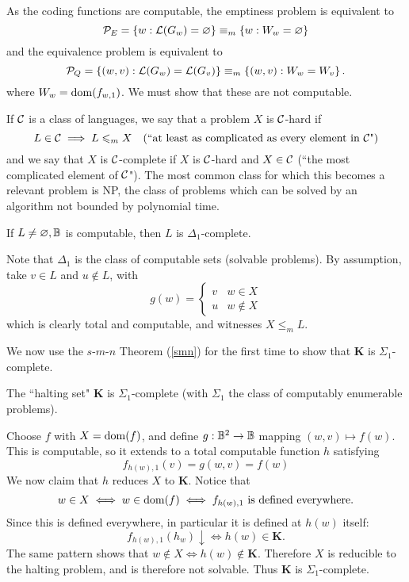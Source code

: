 \documentclass{article}
\begin{document}
As the coding functions are computable, the emptiness problem is equivalent to
\[
	\mathcal{P}_E = \left\lbrace w : \mathcal{L}(G_w) = \varnothing \right\rbrace \equiv_m \left\lbrace w : W_w = \varnothing \right\rbrace
\]
and the equivalence problem is equivalent to
\[
	\mathcal{P}_Q = \left\lbrace (w, v) : \mathcal{L}(G_w) = \mathcal{L}(G_v) \right\rbrace \equiv_m \left\lbrace (w, v): W_w = W_v \right\rbrace.
\]
where $W_w = \operatorname{dom}(f_{w,1})$. We must show that these are not computable.

If $\mathcal{C}$ is a class of languages, we say that a problem $X$ is $\mathcal{C}$-hard if
\[
	L \in \mathcal{C} \implies L \leqslant_m X \quad \text{(``at least as complicated as every element in $\mathcal{C}$")}
\]
and we say that $X$ is $\mathcal{C}$-complete if $X$ is $\mathcal{C}$-hard and $X \in \mathcal{C}$ (``the most complicated element of $\mathcal{C}$"). The most common class for which this becomes a relevant problem is NP, the class of problems which can be solved by an algorithm not bounded by polynomial time.

\begin{proposition}
	If $L \neq \varnothing, \mathbb{B}$ is computable, then $L$ is $\Delta_1$-complete.
\end{proposition}

\begin{prf}
	Note that $\Delta_1$ is the class of computable sets (solvable problems). By assumption, take $v \in L$ and $u \notin L$, with
	\[
		g(w) = \begin{cases}
		v & w \in X \\
		u & w \notin X
		\end{cases}
	\]
	which is clearly total and computable, and witnesses $X \leq_m L$.
\end{prf}

We now use the $s$-$m$-$n$ Theorem (\ref{smn}) for the first time to show that $\mathbf{K}$ is $\Sigma_1$-complete. 

\begin{theorem}
	The ``halting set" $\mathbf{K}$ is $\Sigma_1$-complete (with $\Sigma_1$ the class of computably enumerable problems).
\end{theorem}

\begin{prf}
	Choose $f$ with $X = \operatorname{dom}(f)$, and define $g: \mathbb{B}^2 \to \mathbb{B}$ mapping $(w, v) \mapsto f(w)$. This is computable, so it extends to a total computable function $h$ satisfying
	\[
		f_{h(w), 1} (v) = g(w, v) = f(w)
	\]
	We now claim that $h$ reduces $X$ to $\mathbf{K}$. Notice that
	\[
		w \in X \iff w \in \operatorname{dom}(f) \iff f_{h(w),1} \text{ is defined everywhere}.
	\]
	Since this is defined everywhere, in particular it is defined at $h(w)$ itself:
	\[
		f_{h(w),1}(h_w) \downarrow \iff h(w) \in \mathbf{K}.
	\]
	The same pattern shows that $w \notin X \iff h(w) \notin \mathbf{K}$. Therefore $X$ is reducible to the halting problem, and is therefore not solvable. Thus $\mathbf{K}$ is $\Sigma_1$-complete.
\end{prf}
\end{document}
